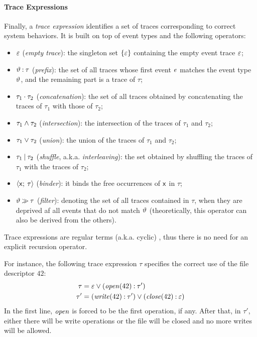 \paragraph{Trace Expressions}
Finally, a \emph{trace expression} identifies a set of traces corresponding to correct system behaviors. It is built on top of event types and the following operators:
\begin{itemize}
	\item $\varepsilon$ (\emph{empty trace}): the singleton set $\{\varepsilon\}$ containing  the empty event trace $\varepsilon$;
	\item $\vartheta\mathbin{:}\tau$ (\emph{prefix}): the set of all traces whose first event $e$ matches the event type $\vartheta$, and the remaining part is a trace of $\tau$;
	\item $\tau_1\mathbin{\cdot}\tau_2$ (\emph{concatenation}): the set of all traces obtained by concatenating the traces of $\tau_1$ with those of $\tau_2$; 
	\item $\tau_1\mathbin{\wedge} \tau_2$ (\emph{intersection}): the intersection of the traces of $\tau_1$ and $\tau_2$;
	\item $\tau_1\mathbin{\vee} \tau_2$ (\emph{union}): the union of the traces of $\tau_1$ and $\tau_2$; 
	\item $\tau_1\mathbin{|} \tau_2$ (\emph{shuffle}, a.k.a. \emph{interleaving}): the set obtained by shuffling the traces of $\tau_1$ with the traces of $\tau_2$;
	\item ${\langle}\mathsf{x};\:{\tau}{\rangle}$ (\emph{binder}): it binds the free occurrences of $\mathsf{x}$ in $\tau$;
	\item $\vartheta\mathbin{\gg}\tau$ (\emph{filter}):
	denoting the set of all traces contained in $\tau$, when they are deprived af all events that do not match $\vartheta$ (theoretically, this operator can also be derived from the others).
\end{itemize}

Trace expressions are regular terms (a.k.a. cyclic) \cite{Courcelle83}, thus there is no need for an explicit recursion operator.

For instance, the following trace expression \(\tau\) specifies the correct use of the file descriptor \(42\):
\begin{align*}
	\tau &= \varepsilon \mathbin{\vee} (\mathit{open}(42) \mathbin{:} \tau')\\
	\tau' &= (\mathit{write}(42) \mathbin{:} \tau') \mathbin{\vee} (\mathit{close}(42) \mathbin{:} \varepsilon)
\end{align*}
In the first line, \(\mathit{open}\) is forced to be the first operation, if any.
After that, in \(\tau'\), either there will be write operations or the file will be closed and no more writes will be allowed.

